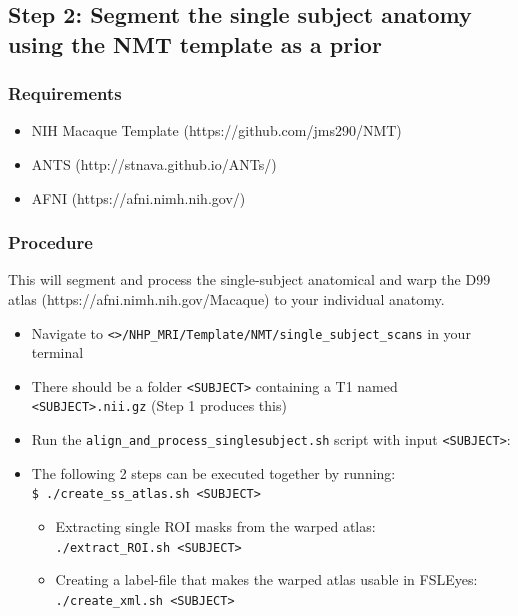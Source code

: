 \documentclass[11pt]{article}
\providecommand{\tightlist}{%
      \setlength{\itemsep}{0pt}\setlength{\parskip}{0pt}}
\begin{document}
    \hypertarget{step-2-segment-the-single-subject-anatomy-using-the-nmt-template-as-a-prior}{%
\subsection{\texorpdfstring{\textbf{Step 2: Segment the single subject
anatomy using the NMT template as a
prior}}{Step 2: Segment the single subject anatomy using the NMT template as a prior}}\label{step-2-segment-the-single-subject-anatomy-using-the-nmt-template-as-a-prior}}

\hypertarget{requirements}{%
\subsubsection{Requirements}\label{requirements}}

\begin{itemize}
\tightlist
\item
  NIH Macaque Template (https://github.com/jms290/NMT)\\
\item
  ANTS (http://stnava.github.io/ANTs/)
\item
  AFNI (https://afni.nimh.nih.gov/)
\end{itemize}

\hypertarget{procedure}{%
\subsubsection{Procedure}\label{procedure}}

This will segment and process the single-subject anatomical and warp the
D99 atlas (https://afni.nimh.nih.gov/Macaque) to your individual
anatomy.

\begin{itemize}
\item
  Navigate to
  \texttt{\textless{}\textgreater{}/NHP\_MRI/Template/NMT/single\_subject\_scans}
  in your terminal
\item
  There should be a folder \texttt{\textless{}SUBJECT\textgreater{}}
  containing a T1 named \texttt{\textless{}SUBJECT\textgreater{}.nii.gz}
  (Step 1 produces this)
\item
  Run the \texttt{align\_and\_process\_singlesubject.sh} script with
  input \texttt{\textless{}SUBJECT\textgreater{}}:
\item
  The following 2 steps can be executed together by running:
  \texttt{\$\ ./create\_ss\_atlas.sh\ \textless{}SUBJECT\textgreater{}}

  \begin{itemize}
  \item
    Extracting single ROI masks from the warped atlas:
    \texttt{./extract\_ROI.sh\ \textless{}SUBJECT\textgreater{}}
  \item
    Creating a label-file that makes the warped atlas usable in FSLEyes:
    \texttt{./create\_xml.sh\ \textless{}SUBJECT\textgreater{}}
  \end{itemize}
\end{itemize}
\end{document}
